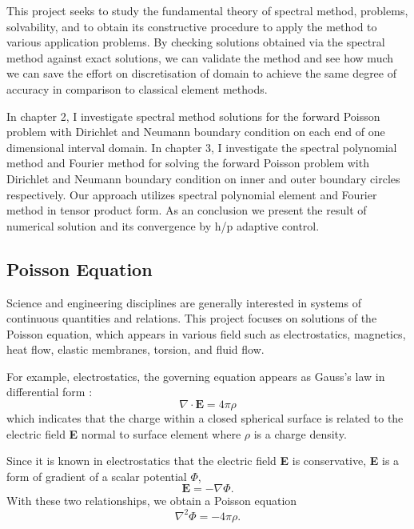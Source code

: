This project seeks to study the fundamental theory of spectral
method, problems, solvability, and to obtain its constructive
procedure to apply the method to various application problems. By
checking solutions obtained via the spectral method against exact
solutions, we can validate the method and see how much we can save
the effort on discretisation of domain to achieve the same degree
of accuracy in comparison to classical element methods.

In chapter 2, I investigate spectral method solutions for the
forward Poisson problem with Dirichlet and Neumann boundary
condition on each end of one dimensional interval domain. In
chapter 3, I investigate the spectral polynomial method and
Fourier method for solving the forward Poisson problem with
Dirichlet and Neumann boundary condition on inner and outer
boundary circles respectively. Our approach utilizes spectral
polynomial element and Fourier method in tensor product form. As
an conclusion we present the result of numerical solution and its
convergence by h/p adaptive control.

\subsection{Poisson Equation}

Science and engineering disciplines are generally interested in
systems of continuous quantities and relations. This project
focuses on solutions of the Poisson equation, which appears in
various field such as electrostatics, magnetics, heat flow,
elastic membranes, torsion, and fluid flow.

For example, electrostatics, the governing equation appears as
Gauss's law in differential form \cite{Johnson}:
\begin{equation}
\nabla \cdot \mathbf{E} = 4 \pi \rho
\end{equation}
which indicates that the charge within a closed spherical surface
is related to the electric field \textbf{E} normal to surface
element where $\rho$ is a charge density.

Since it is known in electrostatics that the electric field \textbf{E} is conservative, \textbf{E} is a form of gradient of a scalar potential $\Phi$,
\begin{equation}
\mathbf{E} = - \nabla\Phi.
\end{equation}
With these two relationships, we obtain a Poisson equation
\begin{equation}
\nabla^2\Phi = -4\pi\rho.
\end{equation}


